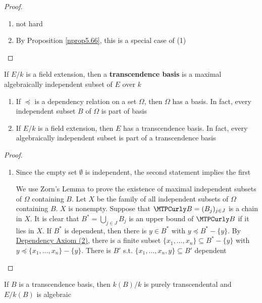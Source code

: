 \documentclass[11pt]{article}
\begin{document}
\begin{proof}
\begin{enumerate}
\item not hard
\item By Proposition \ref{nprop5.66}, this is a special case of (1)
\end{enumerate}
\end{proof}

\begin{definition}[]
If \(E/k\) is a field extension, then a \textbf{transcendence basis} is a maximal
algebraically independent subset of \(E\) over \(k\)
\end{definition}

\begin{theorem}[]
\label{nthm5.70}
\begin{enumerate}
\item If \(\preceq\) is a dependency relation on a set \(\Omega\), then \(\Omega\) has a basis. In
fact, every independent subset \(B\) of \(\Omega\) is part of basis
\item If \(E/k\) is a field extension, then \(E\) has a transcendence basis. In
fact, every algebraically independent subset is part of a transcendence basis
\end{enumerate}
\end{theorem}

\begin{proof}
\begin{enumerate}
\item Since the empty set \(\emptyset\) is independent, the second statement
implies the first

We use Zorn's Lemma to prove the existence of maximal independent subsets
of \(\Omega\) containing \(B\). Let \(X\) be the family of all independent subsets of
\(\Omega\) containing \(B\). \(X\) is nonempty. Suppose that \(\calb=(B_j)_{j\in J}\)
is a chain in \(X\). It is clear that \(B^*=\bigcup_{j\in J}B_j\) is an
upper bound of \(\calb\) if it lies in \(X\). If \(B^*\) is dependent, then
there is \(y\in B^*\) with \(y\preceq B^*-\{y\}\). By \uline{Dependency Axiom
(2)}, there is a finite subset \(\{x_1,\dots,x_n\}\subseteq B^*-\{y\}\)
with \(y\preceq\{x_1,\dots,x_n\}-\{y\}\). There is \(B'\) s.t. 
\(\{x_1,\dots,x_n,y\}\subseteq B'\) dependent
\end{enumerate}
\end{proof}

\begin{theorem}[]
If \(B\) is a transcendence basis, then \(k(B)/k\) is purely transcendental and
\(E/k(B)\) is algebraic
\end{theorem}
\end{document}
